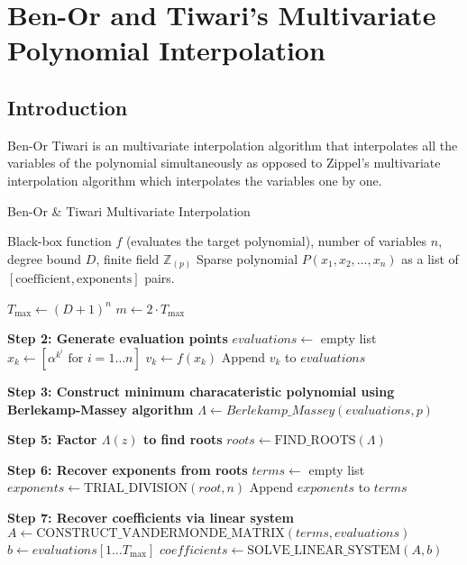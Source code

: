 \chapter{Ben-Or and Tiwari's Multivariate Polynomial Interpolation}
\section{Introduction}
Ben-Or Tiwari is an multivariate interpolation algorithm that interpolates 
all the variables of the polynomial simultaneously as opposed to Zippel's multivariate
interpolation algorithm which interpolates the variables one by one. 


\begin{algorithm}
    \caption{Ben-Or \& Tiwari Multivariate Interpolation}
    \begin{algorithmic}[1]
    \Require Black-box function $f$ (evaluates the target polynomial), number of variables $n$, degree bound $D$, finite field $\mathbb{Z}_(p)$ 
    \Ensure Sparse polynomial $P(x_1, x_2, \dots, x_n)$ as a list of $[\text{coefficient}, \text{exponents}]$ pairs.
    
    \State $T_{\max} \gets (D+1)^n$  
    \State $m \gets 2 \cdot T_{\max}$  
    
    \State \textbf{Step 2: Generate evaluation points}
    \State $evaluations \gets$ empty list
        \State $x_k \gets [\alpha^{k^i} \text{ for } i = 1 \dots n]$
        \State $v_k \gets f(x_k)$
        \State Append $v_k$ to $evaluations$
    \EndFor
    
    \State \textbf{Step 3: Construct minimum characateristic polynomial using Berlekamp-Massey algorithm}
    \State $\Lambda \gets Berlekamp\_Massey(evaluations,p)$
    
    \State \textbf{Step 5: Factor $\Lambda(z)$ to find roots}
    \State $roots \gets \text{FIND\_ROOTS}(\Lambda)$
    
    \State \textbf{Step 6: Recover exponents from roots}
    \State $terms \gets$ empty list
        \State $exponents \gets \text{TRIAL\_DIVISION}(root, n)$
        \State Append $exponents$ to $terms$
    \EndFor
    
    \State \textbf{Step 7: Recover coefficients via linear system}
    \State $A \gets \text{CONSTRUCT\_VANDERMONDE\_MATRIX}(terms, evaluations)$
    \State $b \gets evaluations[1 \dots T_{\max}]$
    \State $coefficients \gets \text{SOLVE\_LINEAR\_SYSTEM}(A, b)$
    

\end{algorithmic}
\end{algorithm}
